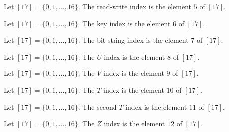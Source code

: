 \begin{definition}
\label{Complexity.LogProg.ExpBFS.rw}
\leanok
Let $[17]=\{0,1,\ldots,16\}$. The read-write index is the element $5$ of $[17]$.
\end{definition}

\begin{definition}
\label{Complexity.LogProg.ExpBFS.rK}
\leanok
Let $[17]=\{0,1,\ldots,16\}$. The key index is the element $6$ of $[17]$.
\end{definition}

\begin{definition}
\label{Complexity.LogProg.ExpBFS.rBs}
\leanok
Let $[17]=\{0,1,\ldots,16\}$. The bit-string index is the element $7$ of $[17]$.
\end{definition}

\begin{definition}[U index]
\label{Complexity.LogProg.ExpBFS.rU}
\leanok
Let $[17]=\{0,1,\ldots,16\}$. The $U$ index is the element $8$ of $[17]$.
\end{definition}

\begin{definition}[V index]
\label{Complexity.LogProg.ExpBFS.rV}
\leanok
Let $[17]=\{0,1,\ldots,16\}$. The $V$ index is the element $9$ of $[17]$.
\end{definition}

\begin{definition}[T index]
\label{Complexity.LogProg.ExpBFS.rT}
\leanok
Let $[17]=\{0,1,\ldots,16\}$. The $T$ index is the element $10$ of $[17]$.
\end{definition}

\begin{definition}
\label{Complexity.LogProg.ExpBFS.rT2}
\leanok
Let $[17]=\{0,1,\ldots,16\}$. The second $T$ index is the element $11$ of $[17]$.
\end{definition}

\begin{definition}[Z index]
\label{Complexity.LogProg.ExpBFS.rZ}
\leanok
Let $[17]=\{0,1,\ldots,16\}$. The $Z$ index is the element $12$ of $[17]$.
\end{definition}

